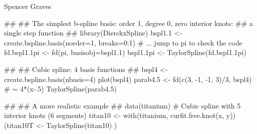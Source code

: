 \begin{Author}\relax
Spencer Graves
\end{Author}
\begin{SeeAlso}\relax
{}
\end{SeeAlso}
\begin{Examples}
\begin{ExampleCode}
##
## The simplest b-spline basis:  order 1, degree 0, zero interior knots:
##       a single step function
##
library(DierckxSpline)
bspl1.1 <- create.bspline.basis(norder=1, breaks=0:1)
# ... jump to pi to check the code
fd.bspl1.1pi <- fd(pi, basisobj=bspl1.1)
bspl1.1pi <- TaylorSpline(fd.bspl1.1pi)


##
## Cubic spline:  4  basis functions
##
bspl4 <- create.bspline.basis(nbasis=4)
plot(bspl4)
parab4.5 <- fd(c(3, -1, -1, 3)/3, bspl4)
# = 4*(x-.5)
TaylorSpline(parab4.5)

##
## A more realistic example
##
data(titanium)
#  Cubic spline with 5 interior knots (6 segments)
titan10 <- with(titanium, curfit.free.knot(x, y))
(titan10T <- TaylorSpline(titan10) )

\end{ExampleCode}
\end{Examples}

